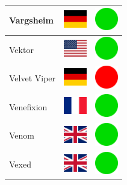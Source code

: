 \documentclass[12pt, a4paper, twoside]{report}
\begin{document}
\begin{center}
\begin{longtable}{|p{5cm}|p{2cm}|p{2cm}|}
 Vargsheim                                                  & \includegraphics[width=1cm]{../4x3/de} &   \includegraphics[width=1cm]{../likes/y} \\ \hline
 Vektor                                                     & \includegraphics[width=1cm]{../4x3/us} &   \includegraphics[width=1cm]{../likes/y} \\ \hline
 Velvet Viper                                               & \includegraphics[width=1cm]{../4x3/de} &   \includegraphics[width=1cm]{../likes/n} \\ \hline
 Venefixion                                                 & \includegraphics[width=1cm]{../4x3/fr} &   \includegraphics[width=1cm]{../likes/y} \\ \hline
 Venom                                                      & \includegraphics[width=1cm]{../4x3/gb} &   \includegraphics[width=1cm]{../likes/y} \\ \hline
 Vexed                                                      & \includegraphics[width=1cm]{../4x3/gb} &   \includegraphics[width=1cm]{../likes/y} \\ \hline

\end{longtable}
\end{center}
\end{document}
